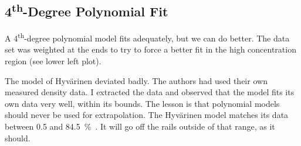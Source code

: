 \documentclass[]{tufte-handout}
\newcommand{\tss}[1]{\textsuperscript{#1}}
\begin{document}
\clearpage
\subsection{4\tss{th}-Degree Polynomial Fit}

A 4\tss{th}-degree polynomial model fits adequately, but we can do better. The data set was weighted at the ends to try to force a better fit in the high concentration region (see lower left plot). 


The model of Hyvärinen deviated badly. The authors had used their own measured density data. I extracted the data and observed that the model fits its own data very well, within its bounds. The lesson is that polynomial models should never be used for extrapolation. The Hyvärinen model matches its data between \num{0.5} and \qty{84.5}{\percent{}}.  It will go off the rails outside of that range, as it should.
\end{document}
